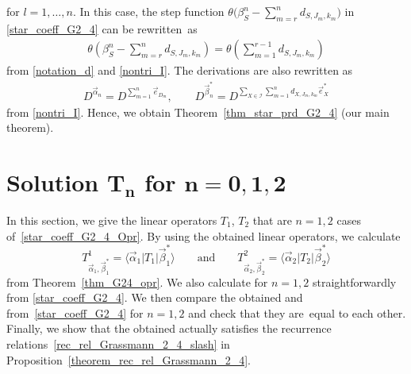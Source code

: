 \documentclass[10pt,a4paper]{amsart}
\numberwithin{equation}{section}
\begin{document}
for $l=1,\dots,n$.
In this case, the step function
$
 \theta
 \bigl(
 \beta_{S}^{n}
 -
 \sum_{m=r}^{n}
 d_{S,J_{m},k_{m}}
 \bigr)
$
in \eqref{star_coeff_G2_4} can be rewritten~as
\begin{align*}
 \theta
 \left(
 \beta_{S}^{n}
 -
 \sum_{m=r}^{n}
 d_{S,J_{m},k_{m}}
 \right)
 =
 \theta
 \left(
 \sum_{m=1}^{r-1}
 d_{
 S,
 J_{m},
 k_{m}
 }
 \right)
\end{align*}
from \eqref{notation_d} and \eqref{nontri_I}.
The derivations are also rewritten as
\begin{align*}
 D^{\vec{\alpha}_{n}}
 =
 D^{
 \sum_{m=1}^{n}
 \vec{e}_{D_{m}}
 },
 \qquad
 D^{\vec{\beta}_{n}^{\ast}}
 =
 D^{
 \sum_{
 X
 \in
 \mathcal{I}
 }
 \sum_{m=1}^{n}
 d_{
 X,
 J_{m},
 k_{m}
 }
 \vec{e}_{X}^{\ast}
 }
\end{align*}
from \eqref{nontri_I}. Hence, we obtain Theorem~\ref{thm_star_prd_G2_4} (our main theorem).

\section[Solution T\_n for n=0,1,2]{Solution $\boldsymbol{T_{n}}$ for $\boldsymbol{n=0,1,2}$}
\label{G24_sol_n012}

In this section, we give the linear operators
$T_{1}$, $T_{2}$
that are $n=1,2$ cases of~\eqref{star_coeff_G2_4_Opr}. By using the obtained linear operators, we calculate
\[
T^{1}_{\vec{\alpha}_{1},\vec{\beta}_{1}^{\ast}}
=
\langle
\vec{\alpha}_{1}
|
T_{1}
|
\vec{\beta}_{1}^{\ast}
\rangle
\qquad \text{and} \qquad
T^{2}_{\vec{\alpha}_{2},\vec{\beta}_{2}^{\ast}}
=
\langle
\vec{\alpha}_{2}
|
T_{2}
|
\vec{\beta}_{2}^{\ast}
\rangle
\]
from Theorem~\ref{thm_G24_opr}. We also calculate  for $n=1,2$ straightforwardly from \eqref{star_coeff_G2_4}. We then compare the obtained
and
 from~\eqref{star_coeff_G2_4}
for $n=1,2$ and check that they are~equal to each other. Finally, we show that the obtained  actually satisfies the recurrence relations~\eqref{rec_rel_Grassmann_2_4_slash} in
Proposition~\ref{theorem_rec_rel_Grassmann_2_4}.
\end{document}
